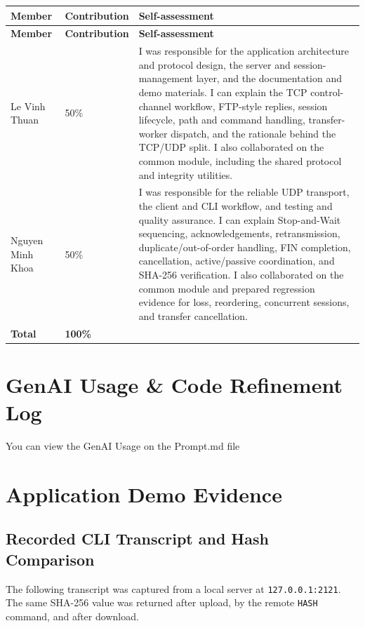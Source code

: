 \documentclass[11pt,a4paper]{article}
\newcommand{\code}[1]{\texttt{#1}}
\begin{document}
\begin{longtable}{@{}P{30mm}P{23mm}P{93mm}@{}}
\toprule
\textbf{Member} & \textbf{Contribution} & \textbf{Self-assessment} \\
\midrule
\endfirsthead
\toprule
\textbf{Member} & \textbf{Contribution} & \textbf{Self-assessment} \\
\midrule
\endhead
Le Vinh Thuan & 50\% & I was responsible for the application architecture and protocol design, the server and session-management layer, and the documentation and demo materials. I can explain the TCP control-channel workflow, FTP-style replies, session lifecycle, path and command handling, transfer-worker dispatch, and the rationale behind the TCP/UDP split. I also collaborated on the common module, including the shared protocol and integrity utilities. \\
\addlinespace
Nguyen Minh Khoa & 50\% & I was responsible for the reliable UDP transport, the client and CLI workflow, and testing and quality assurance. I can explain Stop-and-Wait sequencing, acknowledgements, retransmission, duplicate/out-of-order handling, FIN completion, cancellation, active/passive coordination, and SHA-256 verification. I also collaborated on the common module and prepared regression evidence for loss, reordering, concurrent sessions, and transfer cancellation. \\
\midrule
\textbf{Total} & \textbf{100\%} &  \\
\bottomrule
\end{longtable}

\section{GenAI Usage \& Code Refinement Log}

You can view the GenAI Usage on the Prompt.md file

\section{Application Demo Evidence}

\subsection{Recorded CLI Transcript and Hash Comparison}

The following transcript was captured from a local server at \code{127.0.0.1:2121}. The same SHA-256 value was returned after upload, by the remote \code{HASH} command, and after download.
\end{document}
